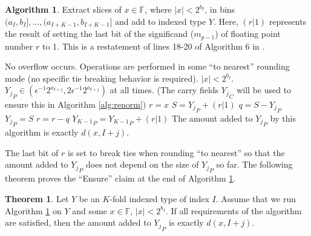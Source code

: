 \documentclass[12pt]{article}
\providecommand{\F}{\ensuremath{\mathbb{F}}}
\providecommand{\To}{\ensuremath{\text{ to }}}
\theoremstyle{definition}
\newtheorem{thm}{Theorem}[section]
\newtheorem{alg}{Algorithm}[section]
\numberwithin{equation}{section}
\numberwithin{figure}{section}
\begin{document}
      \begin{samepage}
      \begin{alg}
        Extract slices of $x \in \F$, where $|x| < 2^{b_I}$, in bins $(a_I, b_I], ..., (a_{I + K - 1}, b_{I + K - 1}]$ and add to indexed type $Y$. Here, $(r | 1)$ represents the result of setting the last bit of the significand ($m_{p - 1}$) of floating point number $r$ to 1. This is a restatement of lines 18-20 of Algorithm $6$ in \cite{repsum}.
        \begin{algorithmic}[1]
          \Require
          \Statex No overflow occurs.
          \Statex Operations are performed in some ``to nearest'' rounding mode (no specific tie breaking behavior is required).
          \Statex $|x| < 2^{b_I}$.
          \Statex ${Y_j}_P \in (\epsilon^{-1}  2^{a_{I + j}}, 2  \epsilon^{-1}  2^{a_{I + j}})$ at all times. (The carry fields ${Y_j}_C$ will be used to ensure this in Algorithm \ref{alg:renorm})
            \State $r = x$ \label{alg:depositrestricted:rgetsx}
            \For{$j = 0 \To (K - 2)$} \label{alg:depositrestricted:loop}
              \State $S = {Y_j}_P + (r | 1)$ \label{alg:depositrestricted:split}
              \State $q = S - {Y_j}_P$
              \State ${Y_j}_P = S$
              \State $r = r - q$\label{alg:depositrestricted:endsplit}
            \EndFor
            \State ${Y_{K - 1}}_P = {Y_{K - 1}}_P + (r | 1)$
          \EndFunction
          \Ensure
          \Statex The amount added to ${Y_j}_P$ by this algorithm is exactly $d(x, I + j)$.
        \end{algorithmic}
        \label{alg:depositrestricted}
      \end{alg}
      \end{samepage}

      The last bit of $r$ is set to break ties when rounding ``to nearest'' so that the amount added to ${Y_j}_P$ does not depend on the size of ${Y_j}_P$ so far. The following theorem proves the ``Ensure'' claim at the end of Algorithm \ref{alg:depositrestricted}.

    \begin{samepage}
      \begin{thm}
        Let $Y$ be an $K$-fold indexed type of index $I$. Assume that we run Algorithm \ref{alg:depositrestricted} on $Y$ and some $x \in \F$, $|x| < 2^{b_I}$. If all requirements of the algorithm are satisfied, then the amount added to ${Y_j}_P$ is exactly $d(x, I + j)$.
        \label{thm:ddepositrestricted}
      \end{thm}
    \end{samepage}
\end{document}
